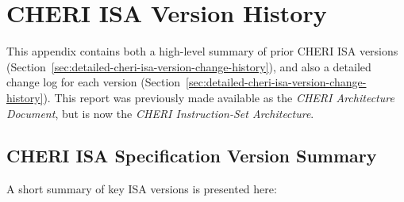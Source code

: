 \chapter{CHERI ISA Version History}
\label{app:versions}

This appendix contains both a high-level summary of prior CHERI ISA versions
(Section~\ref{sec:detailed-cheri-isa-version-change-history}),
and also a detailed change log for each version
(Section~\ref{sec:detailed-cheri-isa-version-change-history}).
This report was previously made available as the {\em CHERI Architecture
Document}, but is now the {\em CHERI Instruction-Set Architecture}.

\section{CHERI ISA Specification Version Summary}
\label{sec:cheri-isa-specification-version-summary}

A short summary of key ISA versions is presented here:

